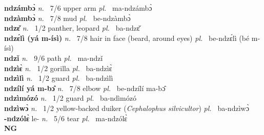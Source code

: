 {\bfseries ndzámbɔ̀}  {\itshape n.~} 7/6 upper arm {\itshape pl.~} ma-ndzámbɔ̀    \\ 
{\bfseries ndzàmbɔ̀}  {\itshape n.~} 7/8 mud {\itshape pl.~} be-ndzàmbɔ̀    \\ 
{\bfseries ndzɛ̌}  {\itshape n.~} 1/2 panther, leopard {\itshape pl.~} ba-ndzɛ̌    \\ 
{\bfseries ndzɛ́lì (yá m-ísì)}  {\itshape n.~} 7/8 hair in face (beard, around eyes) {\itshape pl.~} be-ndzɛ́lì (bé m-ísì)    \\ 
{\bfseries ndzǐ}  {\itshape n.~} 9/6 path {\itshape pl.~} ma-ndzǐ    \\ 
{\bfseries ndzìɛ̀}  {\itshape n.~} 1/2 gorilla {\itshape pl.~} ba-ndzìɛ̀    \\ 
{\bfseries ndzìlì}  {\itshape n.~} 1/2 guard {\itshape pl.~} ba-ndzìlì    \\ 
{\bfseries ndzílí yá m-bɔ̂}  {\itshape n.~} 7/8 elbow {\itshape pl.~} be-ndzílí ma-bɔ̂    \\ 
{\bfseries ndzìmózó}  {\itshape n.~} 1/2 guard {\itshape pl.~} ba-ndìmózó    \\ 
{\bfseries ndzìwɔ̀}  {\itshape n.~} 1/2 yellow-backed duiker ({\itshape Cephalophus silvicultor}) {\itshape pl.~} ba-ndzìwɔ̀    \\ 
{\bfseries -ndzólɛ̀} le- {\itshape n.~} 5/6 tear {\itshape pl.~} ma-ndzólɛ̀    \\ 




\medskip
\noindent \large {\bfseries NG}\normalsize\\
\medskip

